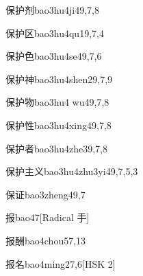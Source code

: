 \begin{entry}{保护剂}{bao3hu4ji4}{9,7,8}
\end{entry}

\begin{entry}{保护区}{bao3hu4qu1}{9,7,4}
\end{entry}

\begin{entry}{保护色}{bao3hu4se4}{9,7,6}
\end{entry}

\begin{entry}{保护神}{bao3hu4shen2}{9,7,9}
\end{entry}

\begin{entry}{保护物}{bao3hu4 wu4}{9,7,8}
\end{entry}

\begin{entry}{保护性}{bao3hu4xing4}{9,7,8}
\end{entry}

\begin{entry}{保护者}{bao3hu4zhe3}{9,7,8}
\end{entry}

\begin{entry}{保护主义}{bao3hu4zhu3yi4}{9,7,5,3}
\end{entry}

\begin{entry}{保证}{bao3zheng4}{9,7}
\end{entry}

\begin{entry}{报}{bao4}{7}[Radical 手]
\end{entry}

\begin{entry}{报酬}{bao4chou5}{7,13}
\end{entry}

\begin{entry}{报名}{bao4ming2}{7,6}[HSK 2]
\end{entry}

